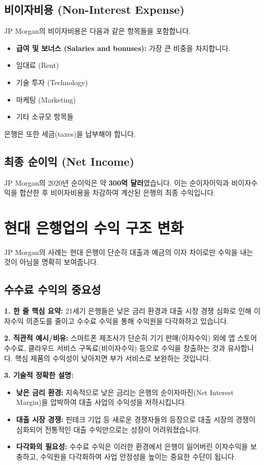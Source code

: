 \documentclass[11pt,a4paper]{book}
\theoremstyle{definition}
\begin{document}
\subsection{비이자비용 (Non-Interest Expense)}

JP Morgan의 비이자비용은 다음과 같은 항목들을 포함합니다.

\begin{itemize}
    \item \textbf{급여 및 보너스 (Salaries and bonuses):} 가장 큰 비중을 차지합니다.
    \item 임대료 (Rent)
    \item 기술 투자 (Technology)
    \item 마케팅 (Marketing)
    \item 기타 소규모 항목들
\end{itemize}
은행은 또한 세금(taxes)을 납부해야 합니다.

\subsection{최종 순이익 (Net Income)}

JP Morgan의 2020년 순이익은 약 \textbf{300억 달러}였습니다. 이는 순이자이익과 비이자수익을 합산한 후 비이자비용을 차감하여 계산된 은행의 최종 수익입니다.


\section{현대 은행업의 수익 구조 변화}

JP Morgan의 사례는 현대 은행이 단순히 대출과 예금의 이자 차이로만 수익을 내는 것이 아님을 명확히 보여줍니다.

\subsection{수수료 수익의 중요성}

\begin{summarybox}[title={수수료 수익 증가의 배경}]
\textbf{1. 한 줄 핵심 요약:} 21세기 은행들은 낮은 금리 환경과 대출 시장 경쟁 심화로 인해 이자수익 의존도를 줄이고 수수료 수익을 통해 수익원을 다각화하고 있습니다.

\textbf{2. 직관적 예시/비유:} 스마트폰 제조사가 단순히 기기 판매(이자수익) 외에 앱 스토어 수수료, 클라우드 서비스 구독료(비이자수익) 등으로 수익을 창출하는 것과 유사합니다. 핵심 제품의 수익성이 낮아지면 부가 서비스로 보완하는 것입니다.

\textbf{3. 기술적 정확한 설명:}
\begin{itemize}
    \item \textbf{낮은 금리 환경:} 지속적으로 낮은 금리는 은행의 순이자마진(Net Interest Margin)을 압박하여 대출 사업의 수익성을 저하시킵니다.
    \item \textbf{대출 시장 경쟁:} 핀테크 기업 등 새로운 경쟁자들의 등장으로 대출 시장의 경쟁이 심화되어 전통적인 대출 수익만으로는 성장이 어려워졌습니다.
    \item \textbf{다각화의 필요성:} 수수료 수익은 이러한 환경에서 은행이 잃어버린 이자수익을 보충하고, 수익원을 다각화하여 사업 안정성을 높이는 중요한 수단이 됩니다.
\end{itemize}
\end{summarybox}
\end{document}
